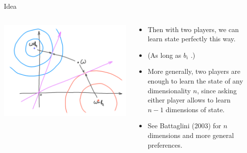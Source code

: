 \documentclass[english,10pt
,aspectratio=169
]{beamer}
\begin{document}
\begin{frame}{Idea}
\begin{columns}
	\begin{column}{0.5\textwidth}
		\begin{center}
			\includegraphics[scale=0.65]{pics/M4/battaglini03.png}
		\end{center}
	\end{column}
	\begin{column}{0.5\textwidth}
		{\small
			\begin{itemize}
				\item Then with two players, we can learn state perfectly this way.
				\item (As long as $b_i$ .)
				\item More generally, two players are enough to learn the state of any dimensionality $n$, since asking either player allows to learn $n-1$ dimensions of state.
				\item See Battaglini (2003) for $n$ dimensions and more general preferences.
			\end{itemize}
		}
	\end{column}
\end{columns}
\end{frame}
\end{document}
